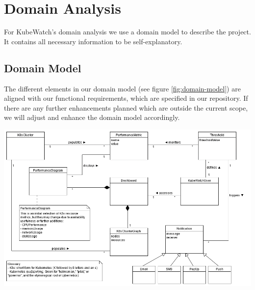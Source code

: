 \chapter{Domain Analysis}


For KubeWatch's domain analysis we use a domain model to describe the project. It contains all necessary information to be self-explanatory.

\section{Domain Model}
The different elements in our domain model (see figure \ref{fig:domain-model}) are aligned with our functional requirements, which are specified in our repository. If there are any further enhancements planned which are outside the current scope, we will adjust and enhance the domain model accordingly.

\vspace{1cm}
\label{fig:domain-model}
\includegraphics[width=\textwidth]{resources/domain_model.png}